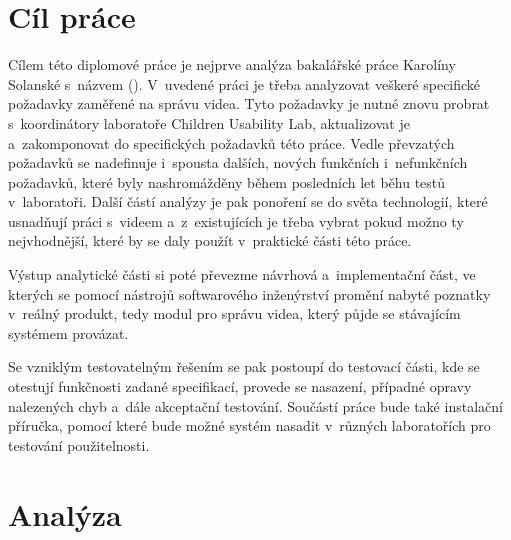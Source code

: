 \documentclass[thesis=M,czech]{FITthesis}[2012/06/26]
\begin{document}
\chapter{Cíl práce}
Cílem této diplomové práce je nejprve analýza bakalářské práce Karolíny Solanské s~názvem  (\cite{solankar}). V~uvedené práci je třeba analyzovat veškeré specifické požadavky zaměřené na správu videa. Tyto požadavky je nutné znovu probrat s~koordinátory  laboratoře Children Usability Lab, aktualizovat je a~zakomponovat do specifických požadavků této práce. Vedle převzatých požadavků se nadefinuje i~spousta dalších, nových funkčních i~nefunkčních požadavků, které byly nashromážděny během posledních let běhu testů v~laboratoři. Další částí analýzy je pak ponoření se do světa technologií, které usnadňují práci s~videem a~z~existujících je třeba vybrat pokud možno ty nejvhodnější, které by se daly použít v~praktické části této práce.
	
	Výstup analytické části si poté převezme návrhová a~implementační část, ve kterých se pomocí nástrojů softwarového inženýrství promění nabyté poznatky v~reálný produkt, tedy modul pro správu videa, který půjde se stávajícím systémem provázat.
	
	Se vzniklým testovatelným řešením se pak postoupí do testovací části, kde se otestují funkčnosti zadané specifikací, provede se nasazení, případné opravy nalezených chyb a~dále akceptační testování.
Součástí práce bude také instalační příručka, pomocí které bude možné systém nasadit v~různých laboratořích pro testování použitelnosti.

\chapter{Analýza}
\end{document}

